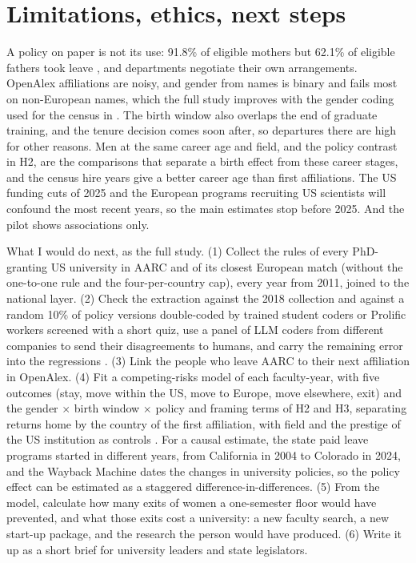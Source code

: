 \documentclass[10pt,twocolumn]{article}
\begin{document}
\section{Limitations, ethics, next steps}
A policy on paper is not its use: 91.8\% of eligible mothers but 62.1\% of eligible fathers took leave \citep{morgan2021}, and departments negotiate their own arrangements. OpenAlex affiliations are noisy, and gender from names is binary and fails most on non-European names, which the full study improves with the gender coding used for the census in \citet{spoon2023}. The birth window also overlaps the end of graduate training, and the tenure decision comes soon after, so departures there are high for other reasons. Men at the same career age and field, and the policy contrast in H2, are the comparisons that separate a birth effect from these career stages, and the census hire years give a better career age than first affiliations. The US funding cuts of 2025 and the European programs recruiting US scientists will confound the most recent years, so the main estimates stop before 2025. And the pilot shows associations only.

What I would do next, as the full study. (1) Collect the rules of every PhD-granting US university in AARC and of its closest European match (without the one-to-one rule and the four-per-country cap), every year from 2011, joined to the national layer. (2) Check the extraction against the 2018 collection and against a random 10\% of policy versions double-coded by trained student coders or Prolific workers screened with a short quiz, use a panel of LLM coders from different companies to send their disagreements to humans, and carry the remaining error into the regressions \citep{gligoric2025}. (3) Link the people who leave AARC to their next affiliation in OpenAlex. (4) Fit a competing-risks model of each faculty-year, with five outcomes (stay, move within the US, move to Europe, move elsewhere, exit) and the gender $\times$ birth window $\times$ policy and framing terms of H2 and H3, separating returns home by the country of the first affiliation, with field and the prestige of the US institution as controls \citep{wapman2022}. For a causal estimate, the state paid leave programs started in different years, from California in 2004 to Colorado in 2024, and the Wayback Machine dates the changes in university policies, so the policy effect can be estimated as a staggered difference-in-differences. (5) From the model, calculate how many exits of women a one-semester floor would have prevented, and what those exits cost a university: a new faculty search, a new start-up package, and the research the person would have produced. (6) Write it up as a short brief for university leaders and state legislators.
\end{document}
